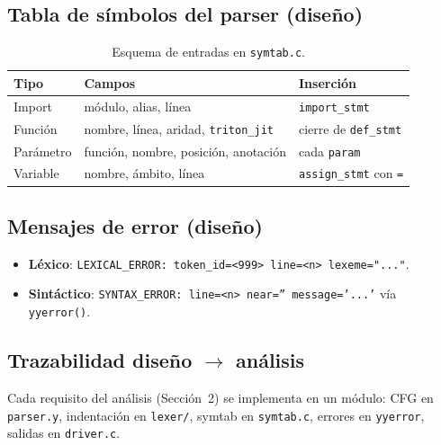 \subsection{Tabla de símbolos del parser (diseño)}
\begin{table}[H]
\centering
\caption{Esquema de entradas en \texttt{symtab.c}.}
\begin{tabular}{@{}lll@{}}
\toprule
Tipo & Campos & Inserción \\
\midrule
Import & módulo, alias, línea & \texttt{import\_stmt} \\
Función & nombre, línea, aridad, \texttt{triton\_jit} & cierre de \texttt{def\_stmt} \\
Parámetro & función, nombre, posición, anotación & cada \texttt{param} \\
Variable & nombre, ámbito, línea & \texttt{assign\_stmt} con \texttt{=} \\
\bottomrule
\end{tabular}
\end{table}

\subsection{Mensajes de error (diseño)}
\begin{itemize}
  \item \textbf{Léxico}: \texttt{LEXICAL\_ERROR: token\_id=<999> line=<n> lexeme="..."}.
  \item \textbf{Sintáctico}: \texttt{SYNTAX\_ERROR: line=<n> near='' message='...'} vía \texttt{yyerror()}.
\end{itemize}

\subsection{Trazabilidad diseño $\rightarrow$ análisis}
Cada requisito del análisis (Sección~2) se implementa en un módulo: CFG en \texttt{parser.y}, indentación en \texttt{lexer/}, symtab en \texttt{symtab.c}, errores en \texttt{yyerror}, salidas en \texttt{driver.c}.
